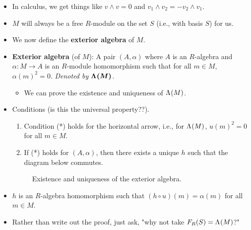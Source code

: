\documentclass[../notes.tex]{subfiles}
\begin{document}
\begin{itemize}
    \item In calculus, we get things like $v\wedge v=0$ and $v_1\wedge v_2=-v_2\wedge v_1$.
    \item $M$ will always be a free $R$-module on the set $S$ (i.e., with basis $S$) for us.
    \item We now define the \textbf{exterior algebra} of $M$.
    \item \textbf{Exterior algebra} (of $M$): A pair $(A,\alpha)$ where $A$ is an $R$-algebra and $\alpha:M\to A$ is an $R$-module homomorphism such that for all $m\in M$, $\alpha(m)^2=0$. \emph{Denoted by} $\bm{\Lambda^{}(M)}$.
    \begin{itemize}
        \item We can prove the existence and uniqueness of $\Lambda^{}(M)$.
    \end{itemize}
    \item Conditions (is this the universal property??).
    \begin{enumerate}
        \item Condition (*) holds for the horizontal arrow, i.e., for $\Lambda^{}(M)$, $u(m)^2=0$ for all $m\in M$.
        \item If (*) holds for $(A,\alpha)$, then there exists a unique $h$ such that the diagram below commutes.
    \end{enumerate}
    \begin{figure}[H]
        \centering
        \caption{Existence and uniqueness of the exterior algebra.}
        \label{fig:existUniqueExAlg}
    \end{figure}
    \item $h$ is an $R$-algebra homomorphism such that $(h\circ u)(m)=\alpha(m)$ for all $m\in M$.
    \item Rather than write out the proof, just ask, "why not take $F_R(S)=\Lambda^{}(M)$?"
    \begin{figure}[H]
        \centering
\end{figure}
\end{itemize}
\end{document}
